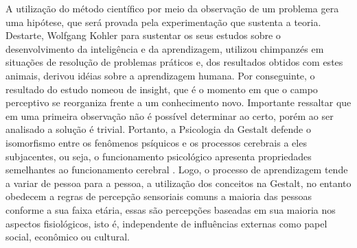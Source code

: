 A utilização do método científico por meio da observação de um problema gera uma hipótese, que será provada pela experimentação que sustenta a teoria. 
Destarte, Wolfgang Kohler para sustentar os seus estudos sobre o desenvolvimento da inteligência e da
aprendizagem, utilizou chimpanzés em situações de resolução de problemas práticos e, dos resultados obtidos com estes animais, derivou idéias sobre a aprendizagem humana. 
Por conseguinte, o resultado do estudo nomeou de insight, que é o momento em que o campo perceptivo se reorganiza frente a um conhecimento novo. 
Importante ressaltar que em uma primeira observação não é possível determinar ao certo, porém ao ser analisado a solução é trivial.
Portanto, a Psicologia da Gestalt defende o isomorfismo entre os fenômenos psíquicos e os
processos cerebrais a eles subjacentes, ou seja, o funcionamento psicológico apresenta propriedades semelhantes ao funcionamento cerebral \cite{silva2007psicologia_educacao}. 
Logo, o processo de aprendizagem tende a variar de pessoa para a pessoa, a utilização dos
conceitos na Gestalt, no entanto obedecem a regras de percepção sensoriais comuns a maioria das pessoas conforme a sua faixa etária, essas são percepções baseadas em sua maioria nos aspectos fisiológicos, isto é, independente de influências externas como papel social, econômico ou cultural.
